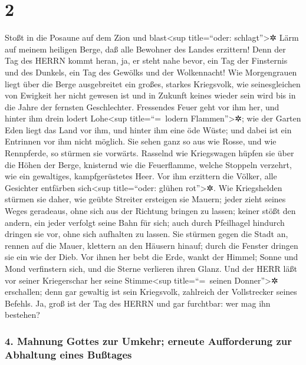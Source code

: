 \hypertarget{section-1}{%
\section{2}\label{section-1}}

Stoßt in die Posaune auf dem Zion und blast\textless sup
title=``oder: schlagt''\textgreater✲ Lärm auf meinem heiligen Berge, daß
alle Bewohner des Landes erzittern! Denn der Tag des HERRN kommt heran,
ja, er steht nahe bevor, ein Tag der Finsternis und des
Dunkels, ein Tag des Gewölks und der Wolkennacht! Wie Morgengrauen liegt
über die Berge ausgebreitet ein großes, starkes Kriegsvolk, wie
seinesgleichen von Ewigkeit her nicht gewesen ist und in Zukunft keines
wieder sein wird bis in die Jahre der fernsten Geschlechter.
Fressendes Feuer geht vor ihm her, und hinter ihm drein
lodert Lohe\textless sup title=``=~lodern Flammen''\textgreater✲; wie
der Garten Eden liegt das Land vor ihm, und hinter ihm eine öde Wüste;
und dabei ist ein Entrinnen vor ihm nicht möglich. Sie
sehen ganz so aus wie Rosse, und wie Rennpferde, so stürmen sie
vorwärts. Rasselnd wie Kriegswagen hüpfen sie über die
Höhen der Berge, knisternd wie die Feuerflamme, welche Stoppeln
verzehrt, wie ein gewaltiges, kampfgerüstetes Heer. Vor
ihm erzittern die Völker, alle Gesichter entfärben sich\textless sup
title=``oder: glühen rot''\textgreater✲. Wie Kriegshelden
stürmen sie daher, wie geübte Streiter ersteigen sie Mauern; jeder zieht
seines Weges geradeaus, ohne sich aus der Richtung bringen zu lassen;
keiner stößt den andern, ein jeder verfolgt seine Bahn für
sich; auch durch Pfeilhagel hindurch dringen sie vor, ohne sich
aufhalten zu lassen. Sie stürmen gegen die Stadt an,
rennen auf die Mauer, klettern an den Häusern hinauf; durch die Fenster
dringen sie ein wie der Dieb. Vor ihnen her bebt die
Erde, wankt der Himmel; Sonne und Mond verfinstern sich, und die Sterne
verlieren ihren Glanz. Und der HERR läßt vor seiner
Kriegerschar her seine Stimme\textless sup title=``=~seinen
Donner''\textgreater✲ erschallen; denn gar gewaltig ist sein Kriegsvolk,
zahlreich der Vollstrecker seines Befehls. Ja, groß ist der Tag des
HERRN und gar furchtbar: wer mag ihn bestehen?

\hypertarget{mahnung-gottes-zur-umkehr-erneute-aufforderung-zur-abhaltung-eines-buuxdftages}{%
\subsubsection{4. Mahnung Gottes zur Umkehr; erneute Aufforderung zur
Abhaltung eines
Bußtages}\label{mahnung-gottes-zur-umkehr-erneute-aufforderung-zur-abhaltung-eines-buuxdftages}}

